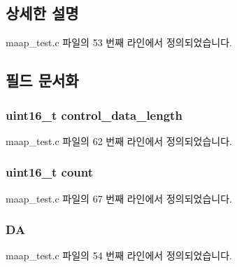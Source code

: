 \subsection{상세한 설명}


maap\+\_\+test.\+c 파일의 53 번째 라인에서 정의되었습니다.



\subsection{필드 문서화}
\subsubsection[{\texorpdfstring{control\+\_\+data\+\_\+length}{control_data_length}}]{\setlength{\rightskip}{0pt plus 5cm}uint16\+\_\+t control\+\_\+data\+\_\+length}\hypertarget{structmaap__packet_acc7cd70455e6e455ac498477b95f9e21}{}\label{structmaap__packet_acc7cd70455e6e455ac498477b95f9e21}


maap\+\_\+test.\+c 파일의 62 번째 라인에서 정의되었습니다.

\subsubsection[{\texorpdfstring{count}{count}}]{\setlength{\rightskip}{0pt plus 5cm}uint16\+\_\+t count}\hypertarget{structmaap__packet_af6a39bfc7e1dc3b6f9c997c1c43fa996}{}\label{structmaap__packet_af6a39bfc7e1dc3b6f9c997c1c43fa996}


maap\+\_\+test.\+c 파일의 67 번째 라인에서 정의되었습니다.

\subsubsection[{\texorpdfstring{DA}{DA}}]{ DA}\hypertarget{structmaap__packet_acb85280d2eab3ae8bc045112037a565d}{}\label{structmaap__packet_acb85280d2eab3ae8bc045112037a565d}


maap\+\_\+test.\+c 파일의 54 번째 라인에서 정의되었습니다.

